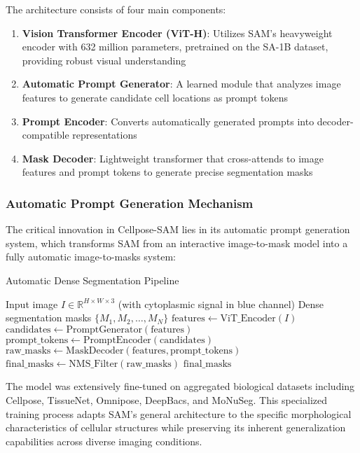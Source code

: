 \documentclass[12pt]{article}
\begin{document}
The architecture consists of four main components:

\begin{enumerate}
  \item \textbf{Vision Transformer Encoder (ViT-H)}: Utilizes SAM's heavyweight encoder with 632 million parameters, pretrained on the SA-1B dataset, providing robust visual understanding
  \item \textbf{Automatic Prompt Generator}: A learned module that analyzes image features to generate candidate cell locations as prompt tokens
  \item \textbf{Prompt Encoder}: Converts automatically generated prompts into decoder-compatible representations
  \item \textbf{Mask Decoder}: Lightweight transformer that cross-attends to image features and prompt tokens to generate precise segmentation masks
\end{enumerate}

\subsubsection{Automatic Prompt Generation Mechanism}

The critical innovation in Cellpose-SAM lies in its automatic prompt generation system, which transforms SAM from an interactive image-to-mask model into a fully automatic image-to-masks system:

\begin{algorithm}[H]
  \caption{Automatic Dense Segmentation Pipeline}
  \begin{algorithmic}[1]
    \REQUIRE Input image $I \in \mathbb{R}^{H \times W \times 3}$ (with cytoplasmic signal in blue channel)
    \ENSURE Dense segmentation masks $\{M_1, M_2, \ldots, M_N\}$
    \STATE $\text{features} \leftarrow \text{ViT\_Encoder}(I)$
    \STATE $\text{candidates} \leftarrow \text{PromptGenerator}(\text{features})$ 
    \STATE $\text{prompt\_tokens} \leftarrow \text{PromptEncoder}(\text{candidates})$
    \STATE $\text{raw\_masks} \leftarrow \text{MaskDecoder}(\text{features}, \text{prompt\_tokens})$
    \STATE $\text{final\_masks} \leftarrow \text{NMS\_Filter}(\text{raw\_masks})$ 
    \RETURN $\text{final\_masks}$
  \end{algorithmic}
\end{algorithm}

The model was extensively fine-tuned on aggregated biological datasets including Cellpose, TissueNet, Omnipose, DeepBacs, and MoNuSeg. This specialized training process adapts SAM's general architecture to the specific morphological characteristics of cellular structures while preserving its inherent generalization capabilities across diverse imaging conditions.
\end{document}
